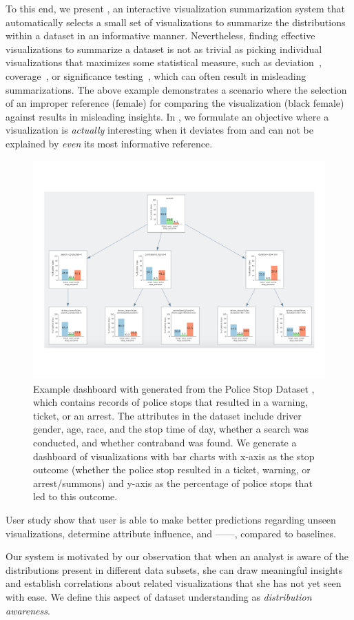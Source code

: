 \par To this end, we present \sbd, an interactive visualization summarization system that automatically selects a small set of visualizations to summarize the distributions within a dataset in an informative manner. Nevertheless, finding effective visualizations to summarize a dataset is not as trivial as picking individual visualizations that maximizes some statistical measure, such as deviation~\cite{Vartak2015}, coverage~\cite{Sarvghad2017}, or significance testing~\cite{Anand2015}, which can often result in misleading summarizations. The above example demonstrates a scenario where the selection of an improper reference (female) for comparing the visualization (black female) against results in misleading insights. In \sbd, we formulate an objective where a visualization is \emph{actually} interesting when it deviates from and can not be explained by \emph{even} its most informative reference.
\begin{figure}[h!]
\label{fig:modalities}
\centering
\includegraphics[width=0.7\linewidth]{figures/storyboard.pdf}
\caption{Example dashboard with generated from the Police Stop Dataset \cite{police}, which contains records of police stops that resulted in a warning, ticket, or an arrest. The attributes in the dataset include driver gender, age, race, and the stop time of day, whether a search was conducted, and whether contraband was found. We generate a dashboard of visualizations with bar charts with x-axis as the stop outcome (whether the police stop resulted in a ticket, warning, or arrest/summons) and y-axis as the percentage of police stops that led to this outcome.}
\end{figure} 
User study show that user is able to make better predictions regarding unseen visualizations, determine attribute influence, and ------, compared to baselines.
\par Our system is motivated by our observation that when an analyst is aware of the distributions present in different data subsets, she can draw meaningful insights and establish correlations about related visualizations that she has not yet seen with ease. We define this aspect of dataset understanding as \emph{distribution awareness}. 



